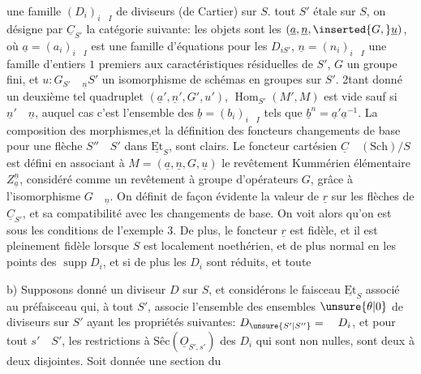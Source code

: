  une famille $(D_i)_{i\quad I}$ de diviseurs (de Cartier) sur $S$.  tout $S'$ étale sur $S$, on désigne par $\underline{C}_{S'}$ la catégorie suivante: les objets sont les   $(\underline{a},\underline{n},\inserted{G,}\underline{u})$, où $\underline{a}=(a_i)_{i\quad I}$ est une famille d'équations pour les $D_{iS'}$, $\underline{n}=(n_i)_{i\quad I}$ une famille d'entiers $1$ premiers aux caractéristiques résiduelles de $S'$,  $G$ un groupe fini, et $u:G_{S'}\quad{}_{\underline{n}}S'$ un isomorphisme de schémas en groupes sur $S'$. 2tant donné un deuxième tel quadruplet  $(\underline{a}',\underline{n}',G',u')$,  $\operatorname{Hom}_{S'}(M',M)$ est vide sauf si $\underline{n}'\quad\underline{n}$, auquel cas c'est l'ensemble des $\underline{b}=(b_i)_{i\quad I}$ tels que $\underline{b}^{n}=\underline{a}'\underline{a}^{-1}$. La composition des morphismes,et la définition des foncteurs changements de base pour une flèche $S''\quad S'$ dans $\underline{\mathrm{Et}}_S$, sont clairs. Le foncteur cartésien $\underline{C}\quad(\mathrm{Sch})/S$ est défini en associant à $M=(\underline{a},\underline{n},G,\underline{u})$ le revêtement Kummérien élémentaire $Z_{\underline{a}}^{\underline{n}}$,   considéré comme un revêtement à groupe d'opérateurs $G$, grâce à l'isomorphisme $G\quad{}_{\underline{n}}$. On définit de façon évidente la valeur de $\underline{r}$ sur les flèches de $\underline{C}_{S'}$, et sa compatibilité avec les changements de base. On voit alors qu'on est sous les conditions de l'exemple 3. De plus, le foncteur $\underline{r}$ est fidèle, et il est pleinement fidèle lorsque $S$ est  localement noethérien, et de plus normal en les points des $\operatorname{supp}D_i$, et si de plus les $D_i$ sont réduits, et toute 

b) Supposons donné un diviseur $D$ sur $S$,  et considérons le faisceau  $\underline{\mathrm{Et}}_S$ associé au préfaisceau qui, à tout $S'$, associe l'ensemble des  ensembles   $\unsure{\theta|0}$ de diviseurs sur $S'$ ayant les propriétés suivantes: $D_{\unsure{S'|S''}}=\quad D_i$, et pour tout $s'\quad S'$, les restrictions  à $\text{Sêc}(\underline{O}_{S',s'})$ des $D_i$ qui sont non nulles, sont deux à deux disjointes. Soit donnée une section du

